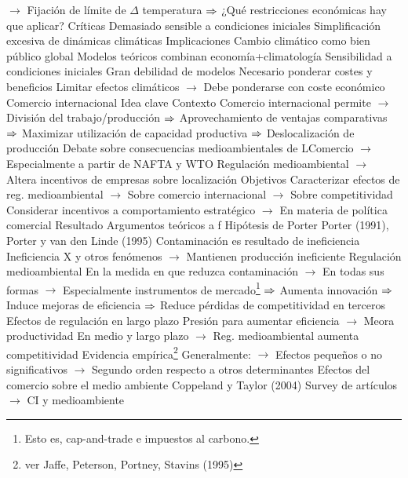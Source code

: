 \documentclass{nuevotema}
\begin{document}
\begin{esquemal}
				\4[] $\to$ Fijación de límite de $\Delta$ temperatura
				\4[] $\Rightarrow$ ¿Qué restricciones económicas hay que aplicar?
				\4 Críticas
				\4[] Demasiado sensible a condiciones iniciales
				\4[] Simplificación excesiva de dinámicas climáticas
			\3 Implicaciones
				\4 Cambio climático como bien público global
				\4 Modelos teóricos combinan economía+climatología
				\4 Sensibilidad a condiciones iniciales
				\4[] Gran debilidad de modelos
				\4 Necesario ponderar costes y beneficios
				\4[] Limitar efectos climáticos
				\4[] $\to$ Debe ponderarse con coste económico
		\2 Comercio internacional
			\3 Idea clave
				\4 Contexto
				\4[] Comercio internacional permite
				\4[] $\to$ División del trabajo/producción
				\4[] $\Rightarrow$ Aprovechamiento de ventajas comparativas
				\4[] $\Rightarrow$ Maximizar utilización de capacidad productiva
				\4[] $\Rightarrow$ Deslocalización de producción
				\4[] Debate sobre consecuencias medioambientales de LComercio
				\4[] $\to$ Especialmente a partir de NAFTA y WTO
				\4[] Regulación medioambiental
				\4[] $\to$ Altera incentivos de empresas sobre localización
				\4[]
				\4 Objetivos
				\4[] Caracterizar efectos de reg. medioambiental
				\4[] $\to$ Sobre comercio internacional
				\4[] $\to$ Sobre competitividad
				\4[] Considerar incentivos a comportamiento estratégico
				\4[] $\to$ En materia de política comercial
				\4 Resultado
				\4[] Argumentos teóricos a f
			\3 Hipótesis de Porter
				\4 Porter (1991), Porter y van den Linde (1995)
				\4 Contaminación es resultado de ineficiencia
				\4[] Ineficiencia X y otros fenómenos
				\4[] $\to$ Mantienen producción ineficiente
				\4 Regulación medioambiental
				\4[] En la medida en que reduzca contaminación
				\4[] $\to$ En todas sus formas
				\4[] $\to$ Especialmente instrumentos de mercado\footnote{Esto es, cap-and-trade e impuestos al carbono.}
				\4[] $\Rightarrow$ Aumenta innovación
				\4[] $\Rightarrow$ Induce mejoras de eficiencia
				\4[] $\Rightarrow$ Reduce pérdidas de competitividad en terceros
				\4 Efectos de regulación en largo plazo
				\4[] Presión para aumentar eficiencia
				\4[] $\to$ Meora productividad
				\4[] En medio y largo plazo
				\4[] $\to$ Reg. medioambiental aumenta competitividad
				\4 Evidencia empírica\footnote{ver Jaffe, Peterson, Portney, Stavins (1995)}
				\4[] Generalmente:
				\4[] $\to$ Efectos pequeños o no significativos
				\4[] $\to$ Segundo orden respecto a otros determinantes
			\3 Efectos del comercio sobre el medio ambiente
				\4 Coppeland y Taylor (2004)
				\4[] Survey de artículos
				\4[] $\to$ CI y medioambiente

\end{esquemal}
\end{document}
